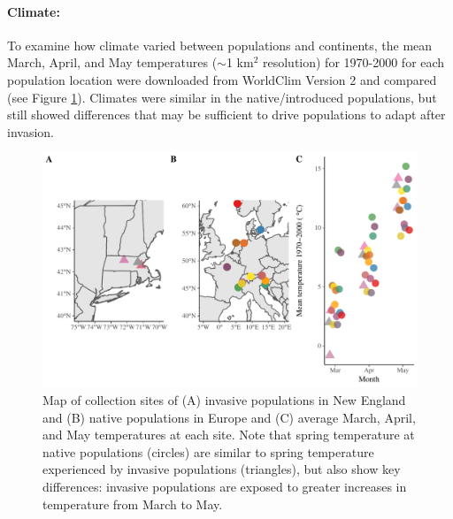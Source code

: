 \documentclass[12pt]{article}\usepackage[]{graphicx}\usepackage[]{color}
\begin{document}
	\paragraph{Climate:} 
	To examine how climate varied between populations and continents, the mean March, April, and May temperatures ($\sim$1 km$^2$ resolution) for 1970-2000 for each population location were downloaded from WorldClim Version 2 \parencite{Fick2017}  and compared (see Figure \ref{fig:sites}). Climates were similar in the native/introduced populations, but still showed differences that may be sufficient to drive populations to adapt after invasion. %
	
	
	\begin{figure} 
		\centering
		\includegraphics[width=1 \textwidth,trim=0cm 0cm 0cm 0cm, angle=0, scale=.9, origin=c,clip=false]{sampling_sites}
		\caption{Map of collection sites of (A) invasive populations in New England and (B) native populations in Europe and (C) average March, April, and May temperatures at each site. Note that spring temperature at native populations (circles) are similar to spring temperature experienced by invasive populations (triangles), but also show key differences: invasive populations are exposed to greater increases in temperature from March to May. } %
		\label{fig:sites}
	\end{figure}
\end{document}
